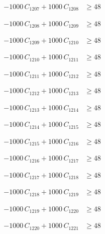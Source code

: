 \documentclass[a4paper,11pt]{article}
\begin{document}
\begin{align}
-1000\,C_{1207} + 1000\,C_{1208} &\geq 48 \nonumber
\end{align}

\begin{align}
-1000\,C_{1208} + 1000\,C_{1209} &\geq 48 \nonumber
\end{align}

\begin{align}
-1000\,C_{1209} + 1000\,C_{1210} &\geq 48 \nonumber
\end{align}

\begin{align}
-1000\,C_{1210} + 1000\,C_{1211} &\geq 48 \nonumber
\end{align}

\begin{align}
-1000\,C_{1211} + 1000\,C_{1212} &\geq 48 \nonumber
\end{align}

\begin{align}
-1000\,C_{1212} + 1000\,C_{1213} &\geq 48 \nonumber
\end{align}

\begin{align}
-1000\,C_{1213} + 1000\,C_{1214} &\geq 48 \nonumber
\end{align}

\begin{align}
-1000\,C_{1214} + 1000\,C_{1215} &\geq 48 \nonumber
\end{align}

\begin{align}
-1000\,C_{1215} + 1000\,C_{1216} &\geq 48 \nonumber
\end{align}

\begin{align}
-1000\,C_{1216} + 1000\,C_{1217} &\geq 48 \nonumber
\end{align}

\begin{align}
-1000\,C_{1217} + 1000\,C_{1218} &\geq 48 \nonumber
\end{align}

\begin{align}
-1000\,C_{1218} + 1000\,C_{1219} &\geq 48 \nonumber
\end{align}

\begin{align}
-1000\,C_{1219} + 1000\,C_{1220} &\geq 48 \nonumber
\end{align}

\begin{align}
-1000\,C_{1220} + 1000\,C_{1221} &\geq 48 \nonumber
\end{align}
\end{document}
